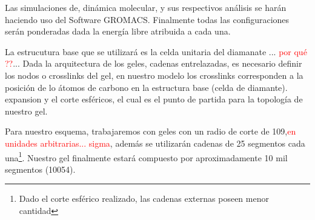 Las simulaciones de, din\'amica molecular, y sus respectivos an\'alisis se harán haciendo uso del Software GROMACS. \addcite[11] 
Finalmente todas las configuraciones serán  ponderadas dada la energía libre atribuida a cada una. \addcite[12]

La estrucutura base que se utilizar\'a es la celda unitaria del diamanate ...\textcolor{red}{ por qu\'e ??}...
Dada la arquitectura de los geles, cadenas entrelazadas, es necesario definir los nodos o crosslinks del gel,  en nuestro modelo los crosslinks corresponden a la posici\'on de lo \'atomos de carbono en la estructura base (celda de diamante).
expansion y el corte esféricos, el cual es el punto de partida para la topolog\'ia de nuestro gel.

Para nuestro esquema, trabajaremos con geles con un radio de corte de 109,\textcolor{red}{en unidades arbitrarias... sigma}, además se utilizarán cadenas de 25 segmentos cada una\footnote{Dado el corte esférico realizado, las cadenas externas poseen menor cantidad}. Nuestro gel finalmente estará compuesto por aproximadamente 10 mil segmentos (10054).